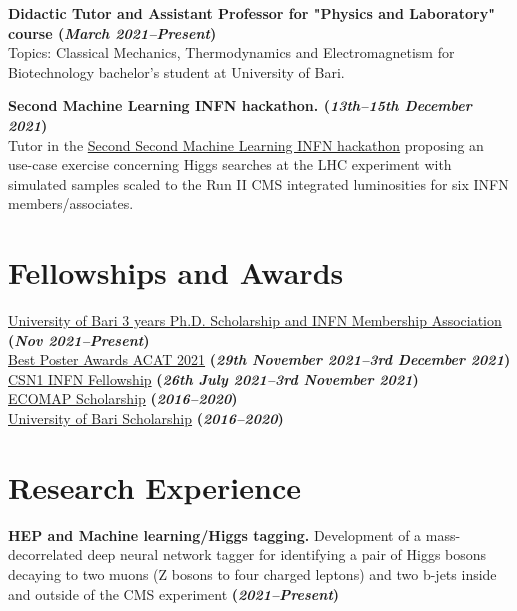 \documentclass[11pt]{res}
\newcommand{\MarginText}[1]{\section{#1}\vspace{10pt}}
\begin{document}
\begin{resume}
\textbf{Didactic Tutor and Assistant Professor for "Physics and Laboratory" course (\textit{March 2021--Present})}\\
Topics: Classical Mechanics, Thermodynamics and Electromagnetism for Biotechnology bachelor's student at University of Bari.

\textbf{Second Machine Learning INFN hackathon. (\textit{13th--15th December 2021})}\\ 
Tutor in the \href{https://agenda.infn.it/event/28565/contributions/148551/}{Second Second Machine Learning INFN hackathon} proposing an use-case exercise concerning Higgs searches at the LHC experiment with simulated samples scaled to the Run II CMS integrated luminosities for six INFN members/associates.


\MarginText{Fellowships and Awards}
\href{https://dottorato.fisica.uniba.it}{University of Bari 3 years Ph.D. Scholarship and INFN Membership Association} \textbf{(\textit{Nov 2021--Present})}\\
\href{https://indico.cern.ch/event/855454/contributions/4596351/}{Best Poster Awards ACAT 2021} \textbf{(\textit{29th November 2021--3rd December 2021})}\\
\href{https://web.infn.it/csn1/index.php/en/}{CSN1 INFN Fellowship} \textbf{(\textit{26th July 2021--3rd November 2021})}\\
\href{https://www.ecomap.it/prestazione.asp?idPR=14}{ECOMAP Scholarship} \textbf{(\textit{2016--2020})}\\
\href{https://www.uniba.it/studenti/segreterie-studenti/amministrative/buoni-libro-per-studenti-meritevoli}{University of Bari Scholarship} \textbf{(\textit{2016--2020})}\\

\MarginText{Research Experience}

\textbf{HEP and Machine learning/Higgs tagging.} Development of a mass-decorrelated deep neural network tagger for identifying a pair of Higgs bosons decaying to two muons (Z bosons to four charged leptons) and two b-jets  inside and outside of the CMS experiment \textbf{(\textit{2021--Present})}


\end{resume}
\end{document}
